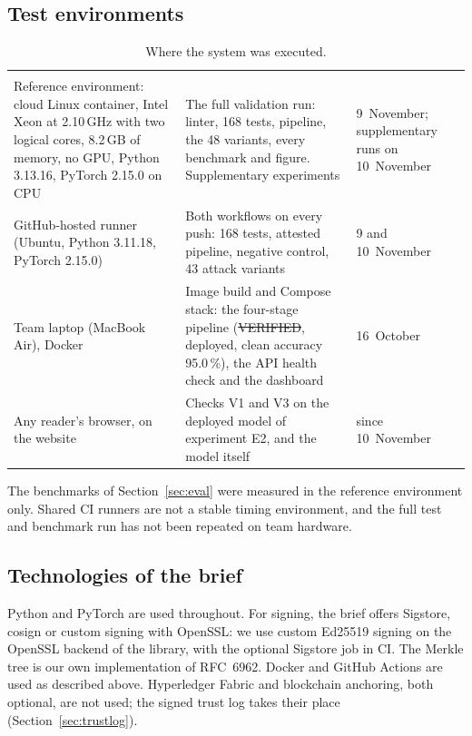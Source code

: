 \subsection{Test environments}
{\tablefont
\begin{xltabular}{\textwidth}{P{4.9cm}LP{2.3cm}}
\caption{Where the system was executed.}\label{tab:env}\\
\toprule
\headrow{} &  &  \\
\midrule
\endfirsthead
\toprule
\headrow{} &  &  \\
\midrule
\endhead
\bottomrule
\endfoot
Reference environment: cloud Linux container, Intel Xeon at 2.10\,GHz with two logical cores, 8.2\,GB of memory, no GPU, Python 3.13.16, PyTorch 2.15.0 on CPU & The full validation run: linter, 168 tests, pipeline, the 48 variants, every benchmark and figure. Supplementary experiments & 9~November; supplementary runs on 10~November \\
GitHub-hosted runner (Ubuntu, Python 3.11.18, PyTorch 2.15.0) & Both workflows on every push: 168 tests, attested pipeline, negative control, 43 attack variants & 9 and 10~November \\
Team laptop (MacBook Air), Docker & Image build and Compose stack: the four-stage pipeline (\st{VERIFIED}, deployed, clean accuracy 95.0\,\%), the API health check and the dashboard & 16~October \\
Any reader's browser, on the website & Checks V1 and V3 on the deployed model of experiment E2, and the model itself & since 10~November \\
\end{xltabular}}

The benchmarks of Section~\ref{sec:eval} were measured in the reference environment only. Shared CI runners are
not a stable timing environment, and the full test and benchmark run has not been repeated on team hardware.

\subsection{Technologies of the brief}
Python and PyTorch are used throughout. For signing, the brief offers Sigstore, cosign or custom signing with
OpenSSL: we use custom Ed25519 signing on the OpenSSL backend of the  library, with the
optional Sigstore job in CI. The Merkle tree is our own implementation of RFC~6962. Docker and GitHub Actions
are used as described above. Hyperledger Fabric and blockchain anchoring, both optional, are not used; the
signed trust log takes their place (Section~\ref{sec:trustlog}).

